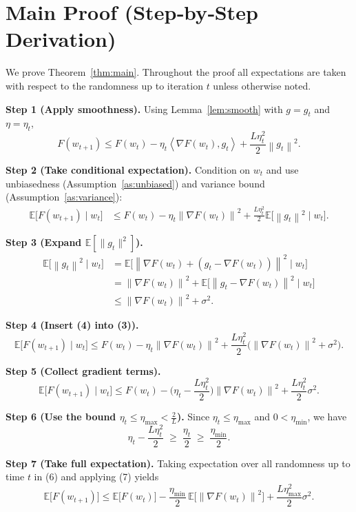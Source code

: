 \documentclass{article}
\newcommand{\E}{\mathbb{E}}
\newcommand{\norm}[1]{\left\|#1\right\|}
\newcommand{\inner}[2]{\left\langle #1,#2\right\rangle}
\begin{document}
\section*{Main Proof (Step‑by‑Step Derivation)}
We prove Theorem~\ref{thm:main}.  Throughout the proof all expectations are taken with respect to the randomness up to iteration $t$ unless otherwise noted.

\noindent\textbf{Step 1 (Apply smoothness).}  
Using Lemma~\ref{lem:smooth} with $g=g_{t}$ and $\eta=\eta_{t}$,
\[
F(w_{t+1})\le F(w_{t})-\eta_{t}\inner{\nabla F(w_{t})}{g_{t}}
+\frac{L\eta_{t}^{2}}{2}\norm{g_{t}}^{2}.
\tag{2}
\]

\noindent\textbf{Step 2 (Take conditional expectation).}  
Condition on $w_{t}$ and use unbiasedness (Assumption~\ref{as:unbiased}) and variance bound (Assumption~\ref{as:variance}):
\[
\begin{aligned}
\E\!\big[F(w_{t+1})\mid w_{t}\big]
&\le F(w_{t})-\eta_{t}\norm{\nabla F(w_{t})}^{2}
      +\frac{L\eta_{t}^{2}}{2}\E\!\big[\norm{g_{t}}^{2}\mid w_{t}\big] .
\end{aligned}
\tag{3}
\]

\noindent\textbf{Step 3 (Expand $\E[\|g_{t}\|^{2}]$).}  
\[
\begin{aligned}
\E\!\big[\norm{g_{t}}^{2}\mid w_{t}\big]
&=\E\!\big[\norm{\nabla F(w_{t})+(g_{t}-\nabla F(w_{t}))}^{2}\mid w_{t}\big] \\
&=\norm{\nabla F(w_{t})}^{2}
  +\E\!\big[\norm{g_{t}-\nabla F(w_{t})}^{2}\mid w_{t}\big] \\
&\le \norm{\nabla F(w_{t})}^{2}+\sigma^{2}.
\end{aligned}
\tag{4}
\]

\noindent\textbf{Step 4 (Insert (4) into (3)).}
\[
\E\!\big[F(w_{t+1})\mid w_{t}\big]
\le F(w_{t})-\eta_{t}\norm{\nabla F(w_{t})}^{2}
+\frac{L\eta_{t}^{2}}{2}\big(\norm{\nabla F(w_{t})}^{2}+\sigma^{2}\big).
\tag{5}
\]

\noindent\textbf{Step 5 (Collect gradient terms).}
\[
\E\!\big[F(w_{t+1})\mid w_{t}\big]
\le F(w_{t})-\Big(\eta_{t}-\frac{L\eta_{t}^{2}}{2}\Big)\norm{\nabla F(w_{t})}^{2}
+\frac{L\eta_{t}^{2}}{2}\sigma^{2}.
\tag{6}
\]

\noindent\textbf{Step 6 (Use the bound $\eta_{t}\le \eta_{\max}<\frac{2}{L}$).}  
Since $\eta_{t}\le\eta_{\max}$ and $0<\eta_{\min}$, we have
\[
\eta_{t}-\frac{L\eta_{t}^{2}}{2}
\;\ge\;
\frac{\eta_{t}}{2}
\;\ge\;
\frac{\eta_{\min}}{2}.
\tag{7}
\]

\noindent\textbf{Step 7 (Take full expectation).}  
Taking expectation over all randomness up to time $t$ in (6) and applying (7) yields
\[
\E\!\big[F(w_{t+1})\big]
\le \E\!\big[F(w_{t})\big]
-\frac{\eta_{\min}}{2}\,\E\!\big[\norm{\nabla F(w_{t})}^{2}\big]
+\frac{L\eta_{\max}^{2}}{2}\sigma^{2}.
\tag{8}
\]
\end{document}
